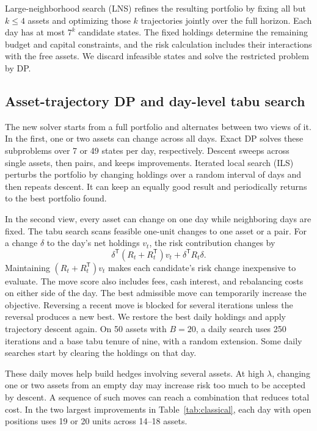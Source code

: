 \documentclass[a4paper]{article}
\begin{document}
Large-neighborhood search (LNS) refines the resulting portfolio by fixing all but \(k\le4\) assets and optimizing
those \(k\) trajectories jointly over the full horizon. Each day has at most \(7^k\) candidate states.
The fixed holdings determine the remaining budget and capital constraints, and the risk calculation includes
their interactions with the free assets. We discard infeasible states and solve the restricted problem by DP.

\subsection{Asset-trajectory DP and day-level tabu search}

The new solver starts from a full portfolio and alternates between two views of it.
In the first, one or two assets can change across all days. Exact DP solves these subproblems over 7 or 49
states per day, respectively. Descent sweeps across single assets, then pairs, and keeps improvements.
Iterated local search (ILS) perturbs the portfolio by changing holdings over a random interval of days and then
repeats descent. It can keep an equally good result and periodically returns to the best portfolio found.

In the second view, every asset can change on one day while neighboring days are fixed. The tabu search scans
feasible one-unit changes to one asset or a pair. For a change \(\delta\) to the day's net holdings \(v_t\),
the risk contribution changes by
\[
\delta^\mathsf{T}(R_t+R_t^\mathsf{T})v_t+\delta^\mathsf{T}R_t\delta .
\]
Maintaining \((R_t+R_t^\mathsf{T})v_t\) makes each candidate's risk change inexpensive to evaluate.
The move score also includes fees, cash interest, and rebalancing costs on either side of the day.
The best admissible move can temporarily increase the objective. Reversing a recent move is blocked for
several iterations unless the reversal produces a new best. We restore the best daily holdings and apply trajectory
descent again. On 50 assets with \(B=20\), a daily search uses 250 iterations and a base tabu tenure of nine,
with a random extension. Some daily searches start by clearing the holdings on that day.

These daily moves help build hedges involving several assets. At high \(\lambda\), changing one or two assets
from an empty day may increase risk too much to be accepted by descent. A sequence of such moves can reach a
combination that reduces total cost. In the two largest improvements in Table~\ref{tab:classical},
each day with open positions uses 19 or 20 units across 14--18 assets.
\end{document}
